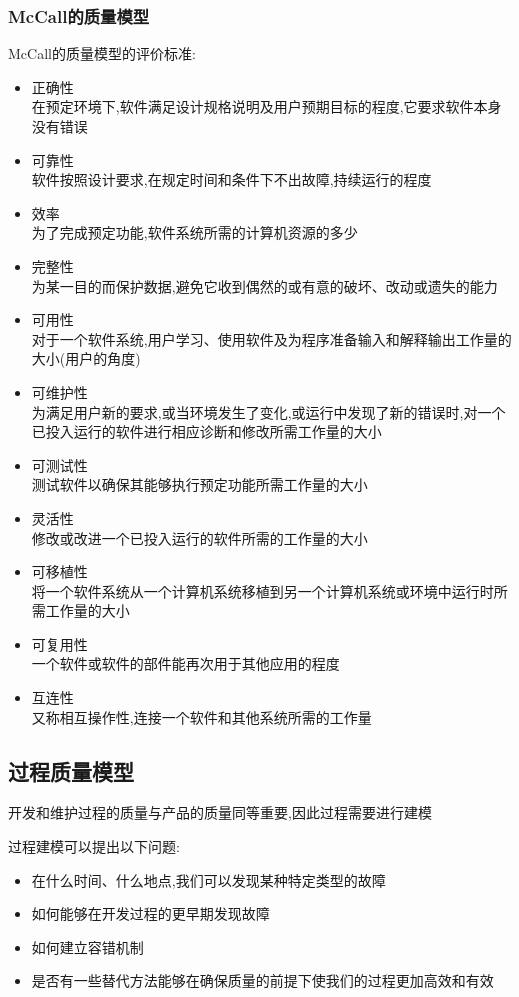 \documentclass[UTF8,a4paper]{ctexart}
\begin{document}
  \subsubsection{McCall的质量模型}
  McCall的质量模型的评价标准:
  \begin{itemize}
    \item 正确性\\
    在预定环境下,软件满足设计规格说明及用户预期目标的程度,它要求软件本身没有错误
    \item 可靠性\\
    软件按照设计要求,在规定时间和条件下不出故障,持续运行的程度
    \item 效率\\
    为了完成预定功能,软件系统所需的计算机资源的多少
    \item 完整性\\
    为某一目的而保护数据,避免它收到偶然的或有意的破坏、改动或遗失的能力
    \item 可用性\\
    对于一个软件系统,用户学习、使用软件及为程序准备输入和解释输出工作量的大小(用户的角度)
    \item 可维护性\\
    为满足用户新的要求,或当环境发生了变化,或运行中发现了新的错误时,对一个已投入运行的软件进行相应诊断和修改所需工作量的大小
    \item 可测试性\\
    测试软件以确保其能够执行预定功能所需工作量的大小
    \item 灵活性\\
    修改或改进一个已投入运行的软件所需的工作量的大小
    \item 可移植性\\
    将一个软件系统从一个计算机系统移植到另一个计算机系统或环境中运行时所需工作量的大小
    \item 可复用性\\
    一个软件或软件的部件能再次用于其他应用的程度
    \item 互连性\\
    又称相互操作性,连接一个软件和其他系统所需的工作量
  \end{itemize}

\subsection{过程质量模型}
开发和维护过程的质量与产品的质量同等重要,因此过程需要进行建模

过程建模可以提出以下问题:
\begin{itemize}
  \item 在什么时间、什么地点,我们可以发现某种特定类型的故障
  \item 如何能够在开发过程的更早期发现故障
  \item 如何建立容错机制
  \item 是否有一些替代方法能够在确保质量的前提下使我们的过程更加高效和有效
\end{itemize}
\end{document}
